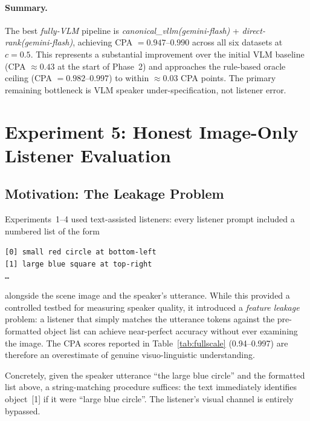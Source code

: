 \documentclass[11pt]{article}
\begin{document}
\paragraph{Summary.}
The best \emph{fully-VLM} pipeline is
\textit{canonical\_vllm(gemini-flash)} + \textit{direct-rank(gemini-flash)},
achieving CPA $= 0.947$--$0.990$ across all six datasets at $c{=}0.5$.
This represents a substantial improvement over the initial VLM baseline
(CPA $\approx 0.43$ at the start of Phase~2) and approaches the rule-based
oracle ceiling (CPA $= 0.982$--$0.997$) to within $\approx 0.03$ CPA points.
The primary remaining bottleneck is VLM speaker under-specification, not
listener error.

\section{Experiment 5: Honest Image-Only Listener Evaluation}
\label{sec:honest}

\subsection{Motivation: The Leakage Problem}

Experiments~1--4 used text-assisted listeners: every listener prompt included a
numbered list of the form
\begin{center}
\texttt{[0] small red circle at bottom-left}\\
\texttt{[1] large blue square at top-right}\\
\texttt{\ldots}
\end{center}
alongside the scene image and the speaker's utterance.
While this provided a controlled testbed for measuring speaker quality, it
introduced a \emph{feature leakage} problem: a listener that simply matches the
utterance tokens against the pre-formatted object list can achieve near-perfect
accuracy without ever examining the image.
The CPA scores reported in Table~\ref{tab:fullscale} (0.94--0.997) are therefore
an overestimate of genuine visuo-linguistic understanding.

Concretely, given the speaker utterance ``the large blue circle'' and the formatted
list above, a string-matching procedure suffices: the text immediately identifies
object~[1] if it were ``large blue circle''.  The listener's visual channel is
entirely bypassed.
\end{document}
